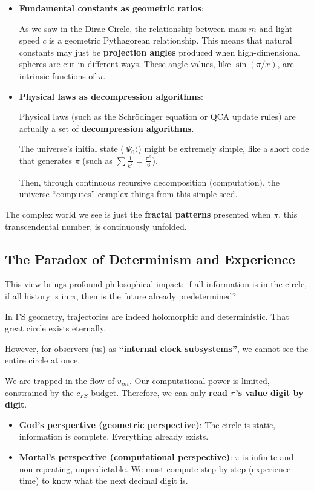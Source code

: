 \begin{itemize}
\item \textbf{Fundamental constants as geometric ratios}:

    As we saw in the Dirac Circle, the relationship between mass $m$ and light speed $c$ is a geometric Pythagorean relationship. This means that natural constants may just be \textbf{projection angles} produced when high-dimensional spheres are cut in different ways. These angle values, like $\sin(\pi/x)$, are intrinsic functions of $\pi$.

\item \textbf{Physical laws as decompression algorithms}:

    Physical laws (such as the Schrödinger equation or QCA update rules) are actually a set of \textbf{decompression algorithms}.

    The universe's initial state ($|\Psi_0\rangle$) might be extremely simple, like a short code that generates $\pi$ (such as $\sum \frac{1}{k^2} = \frac{\pi^2}{6}$).

    Then, through continuous recursive decomposition (computation), the universe ``computes'' complex things from this simple seed.
\end{itemize}

The complex world we see is just the \textbf{fractal patterns} presented when $\pi$, this transcendental number, is continuously unfolded.

\subsection{The Paradox of Determinism and Experience}

This view brings profound philosophical impact: if all information is in the circle, if all history is in $\pi$, then is the future already predetermined?

In FS geometry, trajectories are indeed holomorphic and deterministic. That great circle exists eternally.

However, for observers (us) as \textbf{``internal clock subsystems''}, we cannot see the entire circle at once.

We are trapped in the flow of $v_{int}$. Our computational power is limited, constrained by the $c_{FS}$ budget. Therefore, we can only \textbf{read $\pi$'s value digit by digit}.

\begin{itemize}
\item \textbf{God's perspective (geometric perspective)}: The circle is static, information is complete. Everything already exists.

\item \textbf{Mortal's perspective (computational perspective)}: $\pi$ is infinite and non-repeating, unpredictable. We must compute step by step (experience time) to know what the next decimal digit is.
\end{itemize}

